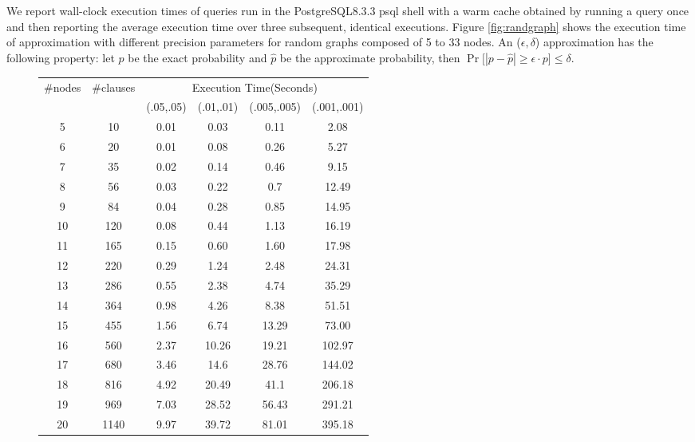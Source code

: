 We report wall-clock execution times
of queries run in the PostgreSQL8.3.3 psql shell with a warm
cache obtained by running a query once and then reporting
the average execution time over three subsequent, identical executions.
Figure \ref{fig:randgraph} shows the execution time of approximation with different precision parameters for random graphs composed of 5 to 33 nodes. An ($\epsilon, \delta$) approximation has the following property: let $p$ be the exact probability and $\hat{p}$ be the approximate probability, then
$\Pr\big[ |p - \hat{p}| \ge \epsilon \cdot p \big] \le \delta$.

\begin{figure}[htp]

\begin{center}
  \begin{tabular}{ | c | c | c | c | c | c | }
    \hline
    \multirow{2}{*}{\#nodes} & \multirow{2}{*}{\#clauses} & \multicolumn{4}{|c|}{Execution Time(Seconds)} \\ \cline{3-6}
          &  & (.05,.05) & (.01,.01) & (.005,.005) &  (.001,.001)  \\ \hline
    5 & 10 & 0.01 & 0.03 & 0.11 & 2.08  \\ \hline
    6 & 20 & 0.01 & 0.08 & 0.26 & 5.27   \\ \hline
	7 & 35 & 0.02 & 0.14 & 0.46 & 9.15   \\ \hline
	8 & 56 & 0.03 & 0.22 & 0.7 & 12.49   \\ \hline
	9 & 84 & 0.04 & 0.28 & 0.85 & 14.95   \\ \hline
	10 & 120 & 0.08 & 0.44 & 1.13 & 16.19   \\ \hline
	11 & 165 & 0.15 & 0.60 & 1.60 & 17.98   \\ \hline
	12 & 220 & 0.29 & 1.24 & 2.48 & 24.31   \\ \hline
	13 & 286 & 0.55 & 2.38 & 4.74 & 35.29   \\ \hline
	14 & 364 & 0.98 & 4.26 & 8.38 & 51.51   \\ \hline
	15 & 455 & 1.56 & 6.74 & 13.29 & 73.00   \\ \hline
	16 & 560 & 2.37 & 10.26 & 19.21 & 102.97   \\ \hline
	17 & 680 & 3.46 & 14.6 & 28.76 & 144.02   \\ \hline
	18 & 816 & 4.92 & 20.49 & 41.1 & 206.18  \\ \hline
	19 & 969 & 7.03 & 28.52 & 56.43 & 291.21  \\ \hline
	20 & 1140 & 9.97 & 39.72 & 81.01 & 395.18  \\ \hline

\end{tabular}
\end{center}
\end{figure}
